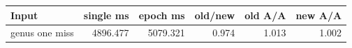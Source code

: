 \begin{center}
\small
\begin{tabular}{lrrrrr}
\toprule
Input & single ms & epoch ms & old/new & old A/A & new A/A\\
\midrule
genus one miss & 4896.477 & 5079.321 & 0.974 & 1.013 & 1.002\\
\bottomrule
\end{tabular}
\end{center}
